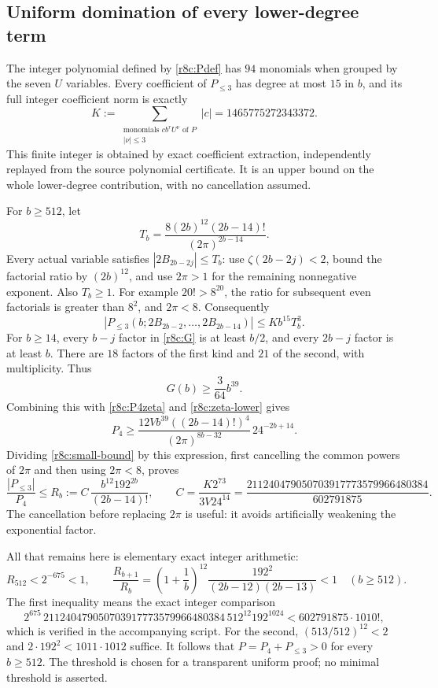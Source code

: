 \documentclass[11pt,a4paper]{article}
\numberwithin{equation}{section}
\theoremstyle{plain}
\theoremstyle{definition}
\theoremstyle{remark}
\begin{document}
\subsection{Uniform domination of every lower-degree term}

The integer polynomial defined by \eqref{r8c:Pdef} has $94$
monomials when grouped by the seven $U$ variables. Every coefficient
of $P_{\le3}$ has degree at most $15$ in $b$, and its full integer
coefficient norm is exactly
\begin{equation}\label{r8c:K}
 K:=\sum_{\substack{\text{monomials }c b^rU^\nu\text{ of }P\\
                         |\nu|\le3}}|c|
       =1465775272343372.
\end{equation}
This finite integer is obtained by exact coefficient extraction,
independently replayed from the source polynomial certificate.
It is an upper bound on the whole lower-degree contribution, with
no cancellation assumed.

For $b\ge512$, let
\[
 T_b=\frac{8(2b)^{12}(2b-14)!}{(2\pi)^{2b-14}}.
\]
Every actual variable satisfies $|2B_{2b-2j}|\le T_b$:
use $\zeta(2b-2j)<2$, bound the factorial ratio by $(2b)^{12}$,
and use $2\pi>1$ for the remaining nonnegative exponent.
Also $T_b\ge1$. For example $20!>8^{20}$, the ratio for subsequent
even factorials is greater than $8^2$, and $2\pi<8$.
Consequently
\begin{equation}\label{r8c:small-bound}
 |P_{\le3}(b;2B_{2b-2},\ldots,2B_{2b-14})|
 \le Kb^{15}T_b^3.
\end{equation}
For $b\ge14$, every $b-j$ factor in \eqref{r8c:G} is at least
$b/2$, and every $2b-j$ factor is at least $b$. There are $18$
factors of the first kind and $21$ of the second, with multiplicity.
Thus
\[
 G(b)\ge\frac{3}{64}b^{39}.
\]
Combining this with \eqref{r8c:P4zeta} and
\eqref{r8c:zeta-lower} gives
\[
 P_4\ge
 \frac{12Vb^{39}((2b-14)!)^4}{(2\pi)^{8b-32}}\,24^{-2b+14}.
\]
Dividing \eqref{r8c:small-bound} by this expression, first cancelling
the common powers of $2\pi$ and then using $2\pi<8$, proves
\begin{equation}\label{r8c:ratio-bound}
 \frac{|P_{\le3}|}{P_4}
 \le R_b:=C\,\frac{b^{12}192^{2b}}{(2b-14)!},\qquad
 C=\frac{K2^{73}}{3V24^{14}}
   =\frac{211240479050703917773579966480384}{602791875}.
\end{equation}
The cancellation before replacing $2\pi$ is useful: it avoids
artificially weakening the exponential factor.

All that remains here is elementary exact integer arithmetic:
\begin{equation}\label{r8c:base-bound}
 R_{512}<2^{-675}<1,
 \qquad
 \frac{R_{b+1}}{R_b}
 =\left(1+\frac1b\right)^{12}
   \frac{192^2}{(2b-12)(2b-13)}<1\quad(b\ge512).
\end{equation}
The first inequality means the exact integer comparison
\[
 2^{675}\,211240479050703917773579966480384\,
       512^{12}192^{1024}
       <602791875\cdot1010!,
\]
which is verified in the accompanying script. For the second,
$(513/512)^{12}<2$ and $2\cdot192^2<1011\cdot1012$ suffice.
It follows that $P=P_4+P_{\le3}>0$ for every $b\ge512$.
The threshold is chosen for a transparent uniform proof; no minimal
threshold is asserted.
\end{document}
